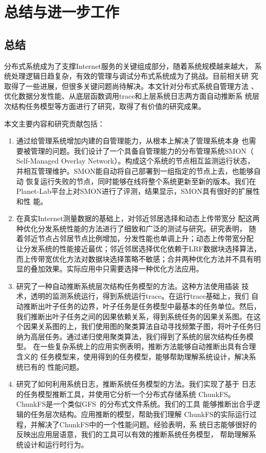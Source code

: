 \chapter{总结与进一步工作}
\label{chap:conclusion}

\section{总结}

分布式系统成为了支撑Internet服务的关键组成部分，随着系统规模越来越大，
系统处理逻辑日趋复杂，有效的管理与调试分布式系统成为了挑战。目前相关研
究取得了一些进展，但很多关键问题尚待解决。本文针对分布式系统自管理方法
、优化数据分发性能、从底层函数调用trace和上层系统日志两方面自动推断系
统层次结构任务模型等方面进行了研究，取得了有价值的研究成果。

本文主要内容和研究贡献包括：

\begin{enumerate}
  
  \item 通过给管理系统增加内建的自管理能力，从根本上解决了管理系统本身
  也需要被管理的问题。我们设计了一个具备自管理能力的分布管理系统SMON（
  Self-Managed Overlay Network）。构成这个系统的节点相互监测运行状态，
  并相互管理维护。SMON能自动将自己部署到一组指定的节点上去，也能够自动
  恢复运行失败的节点，同时能够在线将整个系统更新至新的版本。我们在
  Planet-Lab平台上对SMON进行了评测，结果显示，SMON具有很好的扩展性和性
  能。

  \item 在真实Internet测量数据的基础上，对邻近邻居选择和动态上传带宽分
  配这两种优化分发系统性能的方法进行了细致和广泛的测试与研究。研究表明，
  随着邻近节点占邻居节点比例增加，分发性能也单调上升；动态上传带宽分配
  让分发系统的性能接近最优；邻近邻居选择优化依赖于LRF数据块选择算法，
  而上传带宽优化方法对数据块选择策略不敏感；合并两种优化方法并不具有明
  显的叠加效果。实际应用中只需要选择一种优化方法应用。

  \item 研究了一种自动推断系统层次结构任务模型的方法。这种方法使用插装
  技术，透明的监测系统运行，得到系统运行trace。在运行trace基础上，我们
  自动推断出叶子任务的边界，叶子任务是任务模型中最基本的任务单位。然后，
  我们推断出叶子任务之间的因果依赖关系，得到系统任务的因果关系图。在这
  个因果关系图的上，我们使用图的聚类算法自动寻找频繁子图，将叶子任务归
  纳为高层任务。通过递归使用聚类算法，我们得到了系统的层次结构任务模型。
  在一些复杂系统上的应用实例表明，推断方法能够自动推断出具有合理含义的
  任务模型来，使用得到的任务模型，能够帮助理解系统设计，解决系统已有的
  性能问题。

  \item 研究了如何利用系统日志，推断系统任务模型的方法。我们实现了基于
  日志的任务模型推断工具，并使用它分析一个分布式存储系统
  ChunkFS。ChunkFS是一个类似GFS~\cite{gfs}的分布式文件系统。我们的工具
  能够推断出合乎逻辑的任务层次结构。应用推断的模型，帮助我们理解
  ChunkFS的实际运行过程，并解决了ChunkFS中的一个性能问题。经验表明，系
  统日志能够很好的反映出应用层语意，我们的工具可以有效的推断系统任务模型，
  帮助理解系统设计和运行时行为。

\end{enumerate}

